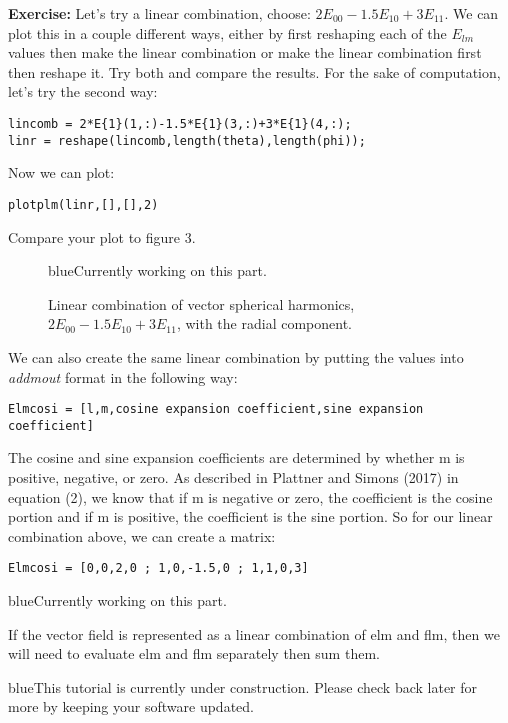 \documentclass[11pt]{article}
\newcommand{\TAG}{\begin{color}{blue}This tutorial is currently under construction. Please check back later for more by keeping your software updated.\end{color}}
\newcommand{\HERE}{\begin{color}{blue}Currently working on this part.\end{color}}
\begin{document}
\textbf{Exercise:}  Let's try a linear combination, choose: $2E_{00}-1.5E_{10}+3E_{11}$.  We can plot this in a couple different ways, either by first reshaping each of the $E_{lm}$ values then make the linear combination or make the linear combination first then reshape it.  Try both and compare the results.  For the sake of computation, let's try the second way:

\verb|lincomb = 2*E{1}(1,:)-1.5*E{1}(3,:)+3*E{1}(4,:);|\\
\verb|linr = reshape(lincomb,length(theta),length(phi));|

Now we can plot:

\verb|plotplm(linr,[],[],2)|

Compare your plot to figure 3.

\begin{figure}[H]
  \centering
  \HERE
  \caption{Linear combination of vector spherical harmonics, $2E_{00}-1.5E_{10}+3E_{11}$, with the radial component.}
\label{E7}
\end{figure}

We can also create the same linear combination by putting the values into \textit{addmout} format in the following way:

\verb|Elmcosi = [l,m,cosine expansion coefficient,sine expansion coefficient]|

The cosine and sine expansion coefficients are determined by whether m is positive, negative, or zero.  As described in Plattner and Simons (2017) in equation (2), we know that if m is negative or zero, the coefficient is the cosine portion and if m is positive, the coefficient is the sine portion.  So for our linear combination above, we can create a matrix:

\verb|Elmcosi = [0,0,2,0 ; 1,0,-1.5,0 ; 1,1,0,3]|



\HERE

If the vector field is represented as a linear combination of elm and flm, then we will need to evaluate elm and flm separately then sum them.



\TAG
\end{document}
